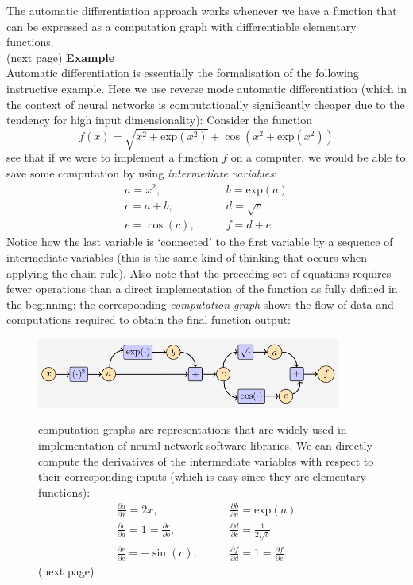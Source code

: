 \documentclass{report}
\begin{document}
The automatic differentiation approach works whenever we have a function that can be expressed as a computation graph
with differentiable elementary functions.\\
(next page)
\newpage
\noindent\textbf{Example}\\
Automatic differentiation is essentially the formalisation of the following instructive example. Here we use reverse mode 
automatic differentiation (which in the context of neural networks is computationally significantly cheaper 
due to the tendency for high input dimensionality): Consider the function
\begin{equation*}
f(x)=\sqrt{x^2+\text{exp}(x^2)}+\cos(x^2+\text{exp}(x^2))
\end{equation*}
see that if we were to implement a function $f$ on a computer, we would be able to save some computation by using 
\textit{intermediate variables}:
\begin{align*}
a=x^2,\quad&\quad
b=\text{exp}(a)\\
c=a+b,\quad&\quad
d=\sqrt{c}\\
e=\cos(c),\quad&\quad
f=d+e
\end{align*}
Notice how the last variable is `connected' to the first variable by a sequence of intermediate variables (this is the same 
kind of thinking that occurs when applying the chain rule). 
Also note that the preceding set of equations requires fewer operations than a direct implementation of the function 
as fully defined in the beginning; the corresponding \textit{computation graph} shows the flow of data and 
computations required to obtain the final function output:
\begin{figure}[h]
\begin{center}
\includegraphics[width=10cm]{29}\\
\end{center}
computation graphs are representations that are widely used in implementation of neural network software libraries.
We can directly compute the derivatives of the intermediate variables with respect to their corresponding inputs 
(which is easy since they are elementary functions):
\begin{align*}
\frac{\partial a}{\partial x}=2x,\quad&\quad
\frac{\partial b}{\partial a}=\text{exp}(a)\\
\frac{\partial c}{\partial a}=1=\frac{\partial c}{\partial b},
\quad&\quad\frac{\partial d}{\partial c}=\frac{1}{2\sqrt{c}}\\
\frac{\partial e}{\partial c}=-\sin(c),\quad&\quad
\frac{\partial f}{\partial d}=1=\frac{\partial f}{\partial e}
\end{align*}
(next page)
\end{figure}
\end{document}
